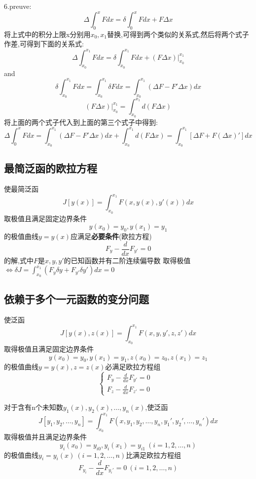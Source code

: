 \documentclass{book}
\begin{document}
6.preuve: \\
$$\Delta \int_{0}^{x}Fdx=\delta \int_{0}^{x}Fdx + F \Delta x$$
将上式中的积分上限x分别用$x_0,x_1$替换,可得到两个类似的关系式,然后将两个式子作差,可得到下面的关系式:
$$\Delta \int_{x_0}^{x_1}Fdx=\delta \int_{x_0}^{x_1}Fdx + (F \Delta x)|_{x_0}^{x_1}$$
and
$$\delta \int_{x_0}^{x_1}Fdx=\int_{x_0}^{x_1}\delta Fdx=\int_{x_0}^{x_1}(\Delta F -F' \Delta x)dx $$
$$(F \Delta x)|_{x_0}^{x_1}=\int_{x_0}^{x_1}d(F \Delta x)$$
将上面的两个式子代入到上面的第三个式子中得到:
$$\Delta \int_{0}^{x}Fdx=\int_{x_0}^{x_1}(\Delta F -F' \Delta x)dx +\int_{x_0}^{x_1}d(F \Delta x)=\int_{x_0}^{x_1}[\Delta F + F (\Delta x)']dx$$
\subsection{最简泛函的欧拉方程}
\begin{theorem}
使最简泛函
$$J[y(x)]=\int_{x_0}^{x_1}F(x,y(x),y'(x))dx$$
取极值且满足固定边界条件
$$
y(x_0)=y_0,y(x_1)=y_1
$$
的极值曲线$y=y(x)$应满足\textbf{必要条件}(欧拉方程)
$$
F_y - \frac{d}{dx}F_{y'} =0
$$
的解,式中$F$是$x,y,y'$的已知函数并有二阶连续偏导数
取得极值 $\Leftrightarrow \delta J = \int_{x_0}^{x_1}(F_y \delta y + F_{y'} \delta y')dx=0$
\end{theorem}

\subsection{依赖于多个一元函数的变分问题}
\begin{theorem}
使泛函$$J[y(x),z(x)]=\int_{x_0}^{x_1}F(x,y,y',z,z')dx$$取得极值且满足固定边界条件
$$
y(x_0)=y_0,y(x_1)=y_1,z(x_0)=z_0,z(x_1)=z_1
$$
的极值曲线$y=y(x),z=z(x)$必满足欧拉方程组
$$
\left\{
  \begin{array}{ll}
    F_y - \frac{d}{dx}F_{y'}=0 & \\
    F_z - \frac{d}{dx}F_{z'}=0 &
  \end{array}
\right.
$$
\end{theorem}

\begin{corollary}
对于含有n个未知数$y_1(x),y_2(x) ,\ldots , y_n(x)$,使泛函
$$J[y_1,y_2 ,\ldots , y_n]=\int_{x_0}^{x_1}F(x,y_1,y_2 ,\ldots , y_n,y_1',y_2' ,\ldots , y_n')dx$$
取得极值并且满足边界条件
$$y_i(x_0)=y_{i0},y_i(x_1)=y_{i1} ~(i=1,2,\dots,n)$$
的极值曲线$y_i=y_i(x)~ (i=1,2,\dots,n)$比满足欧拉方程组
$$F_{y_i} -  \frac{d}{dx}F_{y_i'}=0 ~(i=1,2,\dots,n)$$
\end{corollary}
\end{document}
